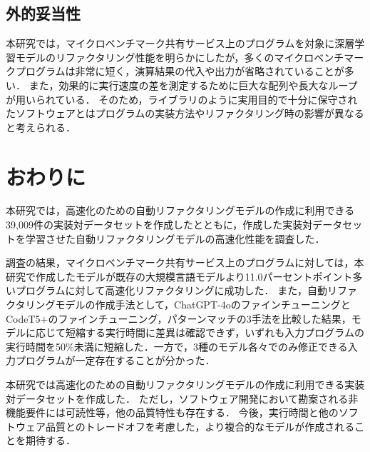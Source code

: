 \documentclass[11pt]{jreport}
\newcommand{\todo}[1]{\colorbox{yellow}{{\bf TODO}:}{\color{red} {\textbf{[#1]}}}}
\newcommand{\fix}[1]{#1}
\newcommand{\fixthree}[1]{#1}
\begin{document}




\section{外的妥当性}


本研究では，マイクロベンチマーク共有サービス上のプログラムを対象に深層学習モデルのリファクタリング性能を明らかにしたが，多くのマイクロベンチマークプログラムは非常に短く，演算結果の代入や出力が省略されていることが多い．
また，効果的に実行速度の差を測定するために巨大な配列や長大なループが用いられている．
そのため，ライブラリのように実用目的で十分に保守されたソフトウェアとはプログラムの実装方法やリファクタリング時の影響が異なると考えられる．




\chapter{おわりに}\label{chapter:conc}


本研究では，高速化のための自動リファクタリングモデルの作成に利用できる39,009件の実装対データセットを作成したとともに，作成した実装対データセットを学習させた自動リファクタリングモデルの高速化性能を調査した．

調査の結果，マイクロベンチマーク共有サービス上のプログラムに対しては，本研究で作成したモデルが既存の大規模言語モデルより11.0\fix{パーセント}ポイント多いプログラムに対して高速化リファクタリングに成功した．
また，自動リファクタリングモデルの作成手法として，ChatGPT-4oのファインチューニングとCodeT5+のファインチューニング，パターンマッチの3手法を比較した結果，モデルに応じて短縮する実行時間に差異は確認できず，\fixthree{いずれも入力プログラムの実行時間を50\%未満に短縮した}．一方で，3種のモデル各々でのみ修正できる入力プログラムが一定存在することが分かった．


\fix{本研究では高速化のための自動リファクタリングモデルの作成に利用できる実装対データセットを作成した．
ただし，ソフトウェア開発において勘案される非機能要件には可読性等，他の品質特性も存在する．
今後，実行時間と他のソフトウェア品質とのトレードオフを考慮した，より複合的なモデルが作成されることを期待する．}
\end{document}
